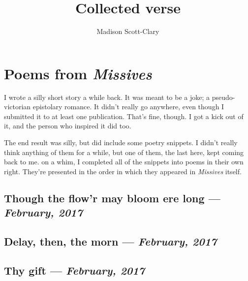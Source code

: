 \documentclass[12pt,letterpaper,oneside]{memoir}
\title{Collected verse}
\author{Madison Scott-Clary}
\date{}
\begin{document}
  \pagestyle{empty}
  \frontmatter
  \maketitle
  \newpage

  \tableofcontents

  \mainmatter
  \pagestyle{fancyplain}

  \chapter{Poems from \textit{Missives}}

  I wrote a silly short story a while back. It was meant to be a joke; a pseudo-victorian epistolary romance. It didn't really go anywhere, even though I submitted it to at least one publication. That's fine, though. I got a kick out of it, and the person who inspired it did too.

  The end result was silly, but did include some poetry snippets. I didn't really think anything of them for a while, but one of them, the last here, kept coming back to me. on a whim, I completed all of the snippets into poems in their own right. They're presented in the order in which they appeared in \textit{Missives} itself.
  \newpage


  \section{Though the flow'r may bloom ere long --- \textit{February, 2017}}

  
  \newpage


  \section{Delay, then, the morn --- \textit{February, 2017}}

  
  \newpage


  \section{Thy gift --- \textit{February, 2017}}

  
  \newpage

\end{document}
